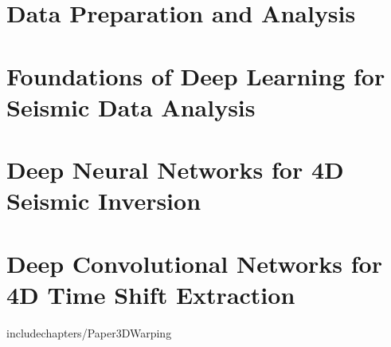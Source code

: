 










\prefrontmatter

\cleartoevenpage

\clearforchapter

\frontmatter






\clearforchapter
\tableofcontents
\clearforchapter
\mylistoftodos

\mainmatter

%



\chapter{Data Preparation and Analysis}
\label{sec:dataprep}




\chapter{Foundations of Deep Learning for Seismic Data Analysis}
\label{sec:foundations}






\chapter{Deep Neural Networks for 4D Seismic Inversion}
\label{sec:inversion}



\chapter{Deep Convolutional Networks for 4D Time Shift Extraction}
\label{sec:timeshift}
 include{chapters/Paper3DWarping}

\appendix

%





\backmatter

\clearforchapter
\newrefcontext[sorting=nyt]
\printbibliography


